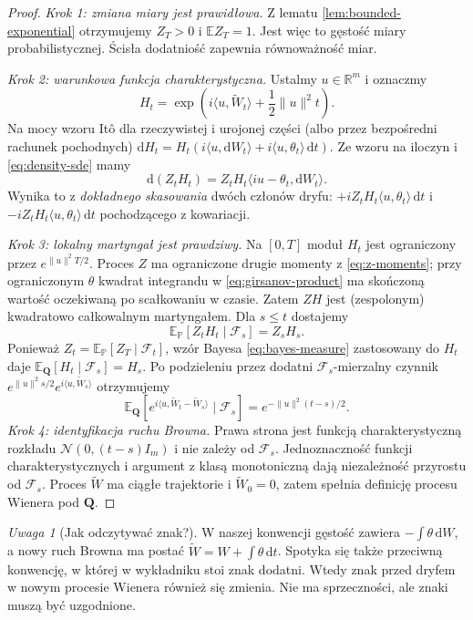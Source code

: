 \documentclass[11pt,a4paper,oneside]{report}
\numberwithin{equation}{chapter}
\theoremstyle{plain}
\theoremstyle{definition}
\theoremstyle{remark}
\newtheorem{uwaga}{Uwaga}[chapter]
\newcommand{\R}{\mathbb{R}}
\newcommand{\Prob}{\mathbb{P}}
\newcommand{\E}{\mathbb{E}}
\newcommand{\calF}{\mathcal{F}}
\newcommand{\dd}{\mathrm{d}}
\newcommand{\norm}[1]{\lVert #1\rVert}
\newcommand{\Normal}{\mathcal{N}}
\begin{document}
\begin{proof}
\emph{Krok 1: zmiana miary jest prawidłowa.}
Z lematu \ref{lem:bounded-exponential} otrzymujemy
$Z_T>0$ i $\E Z_T=1$. Jest więc to gęstość miary
probabilistycznej. Ścisła dodatniość zapewnia
równoważność miar.

\emph{Krok 2: warunkowa funkcja charakterystyczna.}
Ustalmy $u\in\R^m$ i oznaczmy
\[
H_t=\exp\left(i\langle u,\widetilde W_t\rangle
                    +\frac12\norm u^2t\right).
\]
Na mocy wzoru Itô dla rzeczywistej i urojonej
części (albo przez bezpośredni rachunek pochodnych)
$\dd H_t=H_t(i\langle u,\dd W_t\rangle
+i\langle u,\theta_t\rangle\,\dd t)$.
Ze wzoru na iloczyn i \eqref{eq:density-sde} mamy
\[
\dd(Z_tH_t)=Z_tH_t\langle iu-\theta_t,\dd W_t\rangle.
\tag{8.6}\label{eq:girsanov-product}
\]
Wynika to z \emph{dokładnego skasowania} dwóch
członów dryfu: $+iZ_tH_t\langle u,\theta_t\rangle\,\dd t$
i $-iZ_tH_t\langle u,\theta_t\rangle\,\dd t$
pochodzącego z kowariacji.

\emph{Krok 3: lokalny martyngał jest prawdziwy.}
Na $[0,T]$ moduł $H_t$ jest ograniczony przez
$e^{\norm u^2T/2}$. Proces $Z$ ma ograniczone
drugie momenty z \eqref{eq:z-moments}; przy
ograniczonym $\theta$ kwadrat integrandu w
\eqref{eq:girsanov-product} ma skończoną wartość
oczekiwaną po scałkowaniu w czasie. Zatem $ZH$
jest (zespolonym) kwadratowo całkowalnym martyngałem.
Dla $s\le t$ dostajemy
\[
\E_{\Prob}[Z_tH_t\mid\calF_s]=Z_sH_s.
\]
Ponieważ $Z_t=\E_{\Prob}[Z_T\mid\calF_t]$,
wzór Bayesa \eqref{eq:bayes-measure} zastosowany do
$H_t$ daje $\E_{\mathbf Q}[H_t\mid\calF_s]=H_s$.
Po podzieleniu przez dodatni $\calF_s$-mierzalny
czynnik $e^{\norm u^2s/2}e^{i\langle u,\widetilde W_s\rangle}$
otrzymujemy
\[
\E_{\mathbf Q}[e^{i\langle u,\widetilde W_t-\widetilde W_s\rangle}
\mid\calF_s]
=e^{-\norm u^2(t-s)/2}.
\tag{8.7}\label{eq:girsanov-char}
\]
\emph{Krok 4: identyfikacja ruchu Browna.}
Prawa strona jest funkcją charakterystyczną rozkładu
$\Normal(0,(t-s)I_m)$ i nie zależy od $\calF_s$.
Jednoznaczność funkcji charakterystycznych i
argument z klasą monotoniczną dają niezależność
przyrostu od $\calF_s$. Proces $\widetilde W$ ma
ciągłe trajektorie i $\widetilde W_0=0$, zatem
spełnia definicję procesu Wienera pod $\mathbf Q$.
\end{proof}

\begin{uwaga}[Jak odczytywać znak?]
W naszej konwencji gęstość zawiera
$-\int\theta\,\dd W$, a nowy ruch Browna ma postać
$\widetilde W=W+\int\theta\,\dd t$.
Spotyka się także przeciwną konwencję, w której
w wykładniku stoi znak dodatni. Wtedy znak przed
dryfem w nowym procesie Wienera również się zmienia.
Nie ma sprzeczności, ale znaki muszą być uzgodnione.
\end{uwaga}
\end{document}
